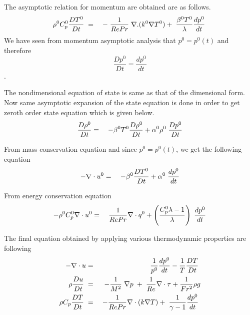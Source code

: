 \noindent The asymptotic relation for momentum are obtained are as follows.
\begin{eqnarray}
\rho^0 C_p^0\frac{D T^0}{D t} \hspace{1mm}&=&\hspace{1mm}-\hspace{1mm}\frac{1}{Re Pr} \hspace{1mm}\nabla.(k^0 \nabla T^0) + \hspace{1mm} \frac{\beta^0 T^0}{\lambda} \frac{d p^0}{d t}\hspace{1mm}
\end{eqnarray}
We have seen from momentum asymptotic analysis that $p^0=p^0(t)$ and therefore $$\frac{D p^0}{D t}= \frac{d p^0}{d t}$$. 
 
\noindent The nondimensional equation of state is same as that of the dimensional form. Now same asymptotic expansion of the state equation is done in order to get zeroth order state equation which is given below. 
\begin{eqnarray}
\frac{D \rho^0}{D t} &=& \hspace{1mm} - \beta^0 T^0 \frac{D \rho^0}{D t} + \alpha^0 \rho^0 \hspace{1mm}\frac{D p^0}{D t}
\end{eqnarray}

\noindent From mass conservation equation and since $p^0=p^0(t)$, we get the following equation
\begin{eqnarray}
- \nabla \cdot u^0 &=& \hspace{1mm} - \beta^0  \frac{D T^0}{D t} + \alpha^0  \hspace{1mm}\frac{d p^0}{d t}
\end{eqnarray}

\noindent From energy conservation equation
\begin{eqnarray}
- \rho^0 C_p^0 \nabla \cdot u^0 &=& \hspace{1mm}  \frac{1}{Re Pr}\nabla \cdot q^0 + \left(\frac{C_p^0 \lambda -1 }{\lambda}  \right)\hspace{1mm}\frac{d p^0}{d t}
\end{eqnarray}

The final equation obtained by applying various thermodynamic properties are following
\begin{eqnarray}
-\nabla \cdot u &=& \frac{1}{p^0} \frac{d p^0}{d t} - \frac{1}{T}\frac{D T}{D t} \hspace{1mm}\\
\rho \frac{D u}{D t} \hspace{1mm} &=& -\frac{1}{M^2}\hspace{1mm}\nabla p\hspace{1mm}+\hspace{1mm}\frac{1}{Re}\nabla \cdot \tau + \frac{1}{Fr^2}\rho g \\
\rho C_p \frac{D T}{D t} \hspace{1mm}&=&\hspace{1mm} -  \frac{1}{Re Pr}\nabla\cdot (k \nabla T) + \hspace{1mm} \frac{1}{\gamma -1} \frac{d p^0}{d t}\hspace{1mm}\\
\end{eqnarray}